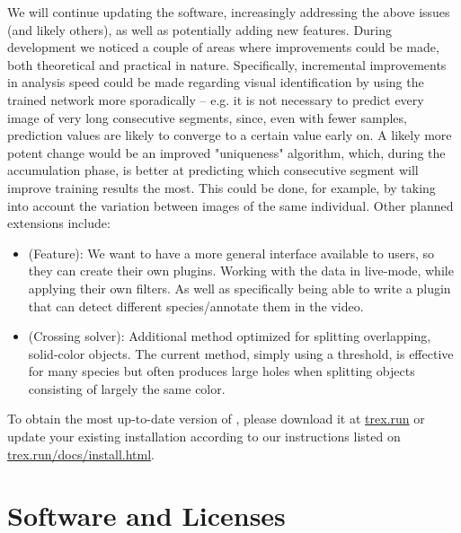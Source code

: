 \documentclass[9pt,lineno]{elife}
\newcommand{\TRex}{\protect\path{TRex}}
\begin{document}
We will continue updating the software, increasingly addressing the above issues (and likely others), as well as potentially adding new features. During development we noticed a couple of areas where improvements could be made, both theoretical and practical in nature. Specifically, incremental improvements in analysis speed could be made regarding visual identification by using the trained network more sporadically -- e.g. it is not necessary to predict every image of very long consecutive segments, since, even with fewer samples, prediction values are likely to converge to a certain value early on. A likely more potent change would be an improved "uniqueness" algorithm, which, during the accumulation phase, is better at predicting which consecutive segment will improve training results the most. This could be done, for example, by taking into account the variation between images of the same individual. Other planned extensions include:

\begin{itemize}
    \item (Feature): We want to have a more general interface available to users, so they can create their own plugins. Working with the data in live-mode, while applying their own filters. As well as specifically being able to write a plugin that can detect different species/annotate them in the video.
    \item (Crossing solver): Additional method optimized for splitting overlapping, solid-color objects. The current method, simply using a threshold, is effective for many species but often produces large holes when splitting objects consisting of largely the same color.
\end{itemize}

To obtain the most up-to-date version of \TRex{}, please download it at \href{https://trex.run}{trex.run} or update your existing installation according to our instructions listed on \href{https://trex.run/docs/install.html}{trex.run/docs/install.html}.

\section{Software and Licenses}
\end{document}
